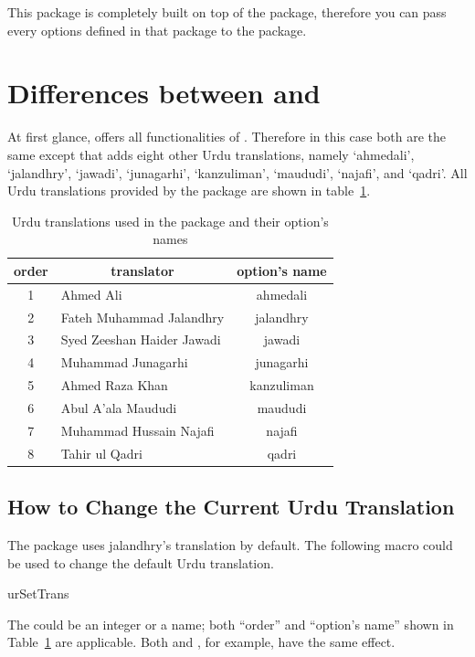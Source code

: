 \documentclass[a4paper]{ltxdoc}
\begin{document}
This package is completely built on top of the  package, therefore you can pass every options
defined in that package to the  package.

\section{Differences between  and }
At first glance,   offers all functionalities of . Therefore in this case
both are the same except that  adds eight other Urdu translations, namely
`ahmedali', `jalandhry', `jawadi', `junagarhi', `kanzuliman', `maududi', `najafi', and `qadri'.
All Urdu translations provided by the package are shown in table~\ref{tab:urtrans}.

\begin{table}[!htbp]
\centering
\begin{tabular}{|c|l|c|}
    \toprule
    order & \multicolumn{1}{c|}{translator} & option's name \\\midrule
    1 & Ahmed Ali & ahmedali \\
    2 & Fateh Muhammad Jalandhry & jalandhry \\
    3 & Syed Zeeshan Haider Jawadi  & jawadi \\
    4 & Muhammad Junagarhi & junagarhi \\
    5 & Ahmed Raza Khan  &  kanzuliman \\
    6 & Abul A'ala Maududi &  maududi \\
    7 & Muhammad Hussain Najafi &  najafi \\
    8 & Tahir ul Qadri  &  qadri \\
    \bottomrule
\end{tabular}
    \caption{Urdu translations used in the package and their option's names}
    \label{tab:urtrans}
\end{table}

\subsection{How to Change the Current Urdu Translation}
    The  package uses jalandhry's translation by default.
    The following macro could be used to change the default Urdu translation.
    \begin{declcs}{urSetTrans}
    \end{declcs}
    The  could be an integer or a name; both ``order'' and ``option's name''
    shown in Table~\ref{tab:urtrans} are applicable. Both  and , for example,
    have the same effect.
\end{document}
